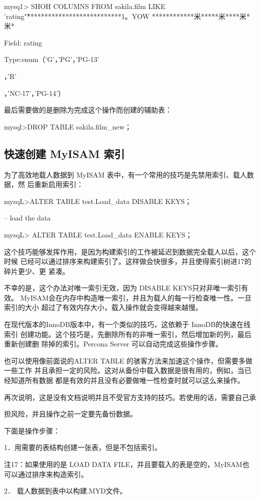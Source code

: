 mysq1> SHOH COLUMNS FROM sakila.film LIKE 'rating"\G

***************************1。YOW ************米*****米****米*米*

Field: rating

Type:enum（'G'，'PG'，'PG-13'

，'R'

，'NC-17'，'PG-14'）

最后需要做的是删除为完成这个操作而创建的辅助表：

mysql>DROP TABLE sakila.film\_new；

\subsection{快速创建 MyISAM 索引}
为了高效地载人数据到 MyISAM 表中，有一个常用的技巧是先禁用索引、载人数据，然
后重新启用索引：

mysqL>ALTER TABLE test.Load\_data DISABLE KEYS；

-- load the data

mysqL> ALTER TABLE test.Load\_data ENABLE KEYS；

这个技巧能够发挥作用，是因为构建索引的工作被延迟到数据完全载人以后，这个时候
已经可以通过排序来构建索引了。这样做会快很多，并且使得索引树进17的碎片更少、更
紧凑。

不幸的是，这个办法对唯一索引无效，因为 DISABLE KEYS只对非唯一索引有效。
MyISAM会在内存中构造唯一索引，并且为载人的每一行检查唯一性。一旦索引的大小
超过了有效内存大小，载入操作就会变得越来越慢。

在现代版本的InnoDB版本中，有一个类似的技巧，这依赖于 InnoDB的快速在线索引
创建功能。这个技巧是，先删除所有的非唯一索引，然后增加新的列，最后重新创建删
除掉的索引。Percona Server 可以自动完成这些操作步骤。

也可以使用像前面说的ALTER TABLE 的骇客方法来加速这个操作，但需要多做一些工作
并且承担一定的风险。这对从备份中载入数据是很有用的，例如，当已经知道所有数据
都是有效的并且没有必要做唯一性检查时就可以这么来操作。

再次说明，这是没有文档说明并且不受官方支持的技巧。若使用的话，需要自己承

担风险，并且操作之前一定要先备份数据。

下面是操作步骤：

1．用需要的表结构创建一张表，但是不包括索引。

注17：如果使用的是 LOAD DATA FILE，并且要载入的表是空的，MyISAM也可以通过排序来构造索引。

2． 载人数据到表中以构建.MYD文件。

